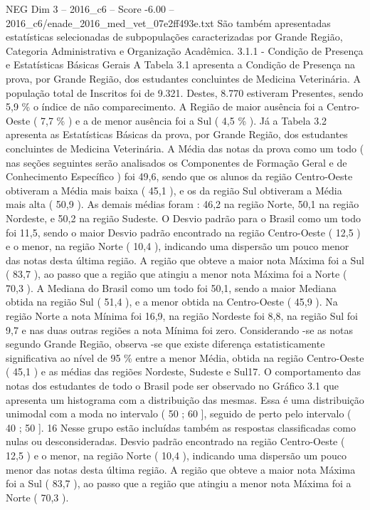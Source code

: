 \begin{textsample}{NEG Dim 3 – 2016\_c6 – Score -6.00 – 2016\_c6/enade\_2016\_med\_vet\_07e2ff493e.txt}
São também apresentadas estatísticas selecionadas de subpopulações caracterizadas por Grande Região, Categoria Administrativa e Organização Acadêmica. 3.1.1 - Condição de Presença e Estatísticas Básicas Gerais A Tabela 3.1 apresenta a Condição de Presença na prova, por Grande Região, dos estudantes concluintes de Medicina Veterinária.
A população total de Inscritos foi de 9.321.
Destes, 8.770 estiveram Presentes, sendo 5,9 \% o índice de não comparecimento.
A Região de maior ausência foi a Centro-Oeste ( 7,7 \% ) e a de menor ausência foi a Sul ( 4,5 \% ).
Já a Tabela 3.2 apresenta as Estatísticas Básicas da prova, por Grande Região, dos estudantes concluintes de Medicina Veterinária.
A Média das notas da prova como um todo ( nas seções seguintes serão analisados os Componentes de Formação Geral e de Conhecimento Específico ) foi 49,6, sendo que os alunos da região Centro-Oeste obtiveram a Média mais baixa ( 45,1 ), e os da região Sul obtiveram a Média mais alta ( 50,9 ).
As demais médias foram : 46,2 na região Norte, 50,1 na região Nordeste, e 50,2 na região Sudeste.
O Desvio padrão para o Brasil como um todo foi 11,5, sendo o maior Desvio padrão encontrado na região Centro-Oeste ( 12,5 ) e o menor, na região Norte ( 10,4 ), indicando uma dispersão um pouco menor das notas desta última região.
A região que obteve a maior nota Máxima foi a Sul ( 83,7 ), ao passo que a região que atingiu a menor nota Máxima foi a Norte ( 70,3 ).
A Mediana do Brasil como um todo foi 50,1, sendo a maior Mediana obtida na região Sul ( 51,4 ), e a menor obtida na Centro-Oeste ( 45,9 ).
Na região Norte a nota Mínima foi 16,9, na região Nordeste foi 8,8, na região Sul foi 9,7 e nas duas outras regiões a nota Mínima foi zero.
Considerando -se as notas segundo Grande Região, observa -se que existe diferença estatisticamente significativa ao nível de 95 \% entre a menor Média, obtida na região Centro-Oeste ( 45,1 ) e as médias das regiões Nordeste, Sudeste e Sul17.
O comportamento das notas dos estudantes de todo o Brasil pode ser observado no Gráfico 3.1 que apresenta um histograma com a distribuição das mesmas.
Essa é uma distribuição unimodal com a moda no intervalo ( 50 ; 60 ], seguido de perto pelo intervalo ( 40 ; 50 ]. 16 Nesse grupo estão incluídas também as respostas classificadas como nulas ou desconsideradas.
Desvio padrão encontrado na região Centro-Oeste ( 12,5 ) e o menor, na região Norte ( 10,4 ), indicando uma dispersão um pouco menor das notas desta última região.
A região que obteve a maior nota Máxima foi a Sul ( 83,7 ), ao passo que a região que atingiu a menor nota Máxima foi a Norte ( 70,3 ).

\end{textsample}
